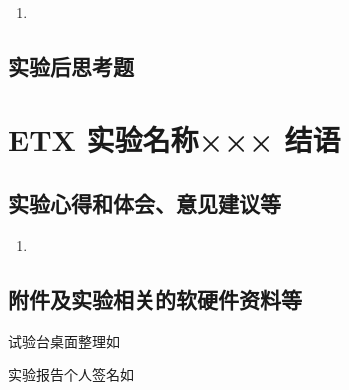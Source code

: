 \documentclass[dvipsnames, svgnames,a4paper,11pt]{article}
\begin{document}
	\subsubsection{}
	\begin{enumerate}
		\item 
	\end{enumerate}
	
	\subsubsection{}
	
	
	\subsection{实验后思考题}
	
	\begin{question}
		
	\end{question}
	
	\begin{question}
		
	\end{question}
	
	\begin{question}
		
	\end{question}
	
	
	
	\clearpage
	
	\section{ETX 实验名称××× \quad\heiti 结语}
	
	\subsection{实验心得和体会、意见建议等}
	\begin{enumerate}
		\item 
	\end{enumerate}
	

	\subsection{附件及实验相关的软硬件资料等}
	试验台桌面整理如%
	
	实验报告个人签名如

	
	
\end{document}
